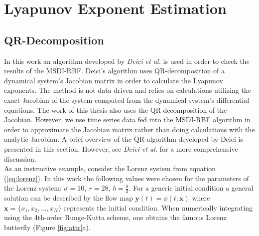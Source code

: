     \section{Lyapunov Exponent Estimation}\label{sec:lyuest}
        \subsection{QR-Decomposition}

                In this work an algorithm developed by \textit{Deici et al.} \cite{item:7} is used in order to check the results
                of the MSDI-RBF. Deici's algorithm uses QR-decomposition of a dynamical system's
                Jacobian matrix in order to calculate the Lyapunov exponents. The method is not
                data driven and relies on calculations utilizing the exact Jacobian of the system computed from the dynamical system's differential equations.
                The work of this thesis also uses the QR-decomposition of the Jacobian. However, we use time series data fed into the MSDI-RBF algorithm in order to approximate the
                Jacobian matrix rather than doing calculations with the analytic Jacobian. A brief overview
                of the QR-algorithm developed by Deici is presented in this section. However, see \textit{Deici et al.} \cite{item:7} for a more comprehensive
                discussion.\\

                As an instructive example, consider the Lorenz system from equation (\ref{eq:lorenz}). In this work the following values
                were chosen for the parameters of the Lorenz system: $\sigma=10, \ r=28, \ b=\frac{8}{3}$. For a generic initial %
                condition a general solution can be described by the flow map $\mathbf{y}(t)=\phi(t;\mathbf{x})$ where $\mathbf{x}=\{x_1, x_2,...,x_N\}$
                represents the initial condition. When numerically integrating using the 4th-order Runge-Kutta scheme,
                one obtains the famous Lorenz butterfly (Figure \ref{fig:attr}a).\\

